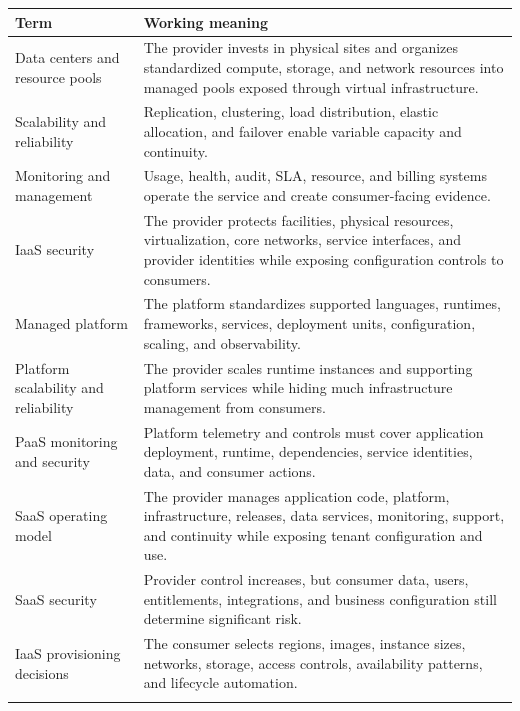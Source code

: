 \documentclass[11pt]{article}
\begin{document}
\begin{longtable}{@{}>{\RaggedRight\arraybackslash}p{}>{\RaggedRight\arraybackslash}p{}@{}}
\toprule\rowcolor{Navy}\color{white}\textbf{Term} & \color{white}\textbf{Working meaning}\\\midrule\endhead
Data centers and resource pools & The provider invests in physical sites and organizes standardized compute, storage, and network resources into managed pools exposed through virtual infrastructure. \\\addlinespace[2pt]
Scalability and reliability & Replication, clustering, load distribution, elastic allocation, and failover enable variable capacity and continuity. \\\addlinespace[2pt]
Monitoring and management & Usage, health, audit, SLA, resource, and billing systems operate the service and create consumer-facing evidence. \\\addlinespace[2pt]
IaaS security & The provider protects facilities, physical resources, virtualization, core networks, service interfaces, and provider identities while exposing configuration controls to consumers. \\\addlinespace[2pt]
Managed platform & The platform standardizes supported languages, runtimes, frameworks, services, deployment units, configuration, scaling, and observability. \\\addlinespace[2pt]
Platform scalability and reliability & The provider scales runtime instances and supporting platform services while hiding much infrastructure management from consumers. \\\addlinespace[2pt]
PaaS monitoring and security & Platform telemetry and controls must cover application deployment, runtime, dependencies, service identities, data, and consumer actions. \\\addlinespace[2pt]
SaaS operating model & The provider manages application code, platform, infrastructure, releases, data services, monitoring, support, and continuity while exposing tenant configuration and use. \\\addlinespace[2pt]
SaaS security & Provider control increases, but consumer data, users, entitlements, integrations, and business configuration still determine significant risk. \\\addlinespace[2pt]
IaaS provisioning decisions & The consumer selects regions, images, instance sizes, networks, storage, access controls, availability patterns, and lifecycle automation. \\\addlinespace[2pt]

\end{longtable}
\end{document}
